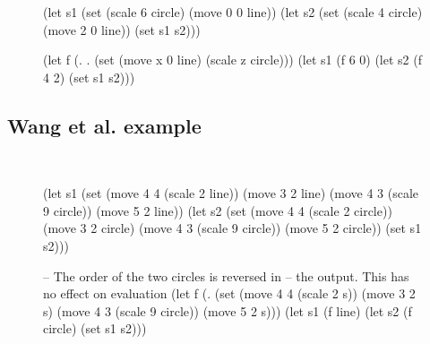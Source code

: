 \documentclass[acmsmall,nonacm]{acmart}\settopmatter{}
\begin{document}
\begin{figure}[h!]
  \begin{minipage}[c]{.5\linewidth}
    \centering
    
    \begin{nanoml}[xleftmargin=0]
(let s1 (set (scale 6 circle) (move 0 0 line))
  (let s2 (set (scale 4 circle) (move 2 0 line))
    (set s1 s2)))
    \end{nanoml}
  \end{minipage}%
  \begin{minipage}[c]{.5\linewidth}
    \centering
    \begin{nanoml}[xleftmargin=.1\linewidth]
(let f (\z. \x. (set (move x 0 line) (scale z circle)))
  (let s1 (f 6 0)
    (let s2 (f 4 2)
      (set s1 s2)))
    \end{nanoml}
  \end{minipage}
\end{figure}

\subsection{Wang et al. example}

\ %

\begin{figure}[h!]
  \begin{minipage}[c]{.5\linewidth}
    \centering
    
    \begin{nanoml}[xleftmargin=0]
(let s1 (set
  (move 4 4 (scale 2 line))
  (move 3 2 line)
  (move 4 3 (scale 9 circle))
  (move 5 2 line))
  (let s2 (set
    (move 4 4 (scale 2 circle))
    (move 3 2 circle)
    (move 4 3 (scale 9 circle))
    (move 5 2 circle))
      (set s1 s2)))
    \end{nanoml}
  \end{minipage}%
  \begin{minipage}[c]{.5\linewidth}
    \centering
    \begin{nanoml}[xleftmargin=.1\linewidth]
-- The order of the two circles is reversed in
-- the output. This has no effect on evaluation
(let f (\s. (set
  (move 4 4 (scale 2 s))
  (move 3 2 s)
  (move 4 3 (scale 9 circle))
  (move 5 2 s)))
  (let s1 (f line)
    (let s2 (f circle)
      (set s1 s2)))
    \end{nanoml}
  \end{minipage}
\end{figure}


\end{document}
